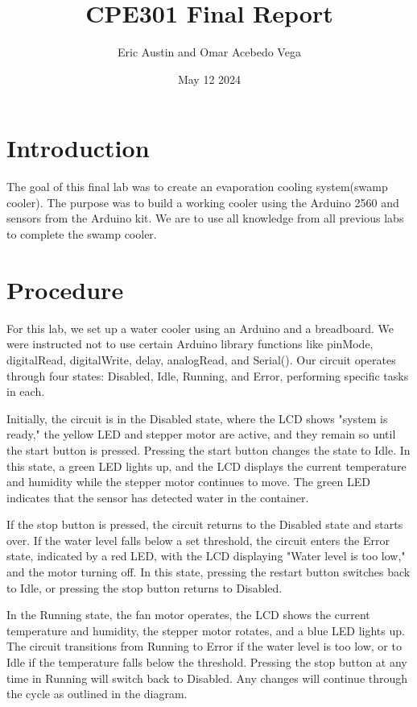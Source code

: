 \documentclass{article}
\title{CPE301 Final Report}
\author{Eric Austin and Omar Acebedo Vega}
\date{May 12 2024}
\begin{document}
\maketitle

\section{Introduction}
The goal of this final lab was to create an evaporation cooling system(swamp cooler). The purpose was to build a working cooler using the Arduino
2560 and sensors from the Arduino kit. We are to use all knowledge from all previous labs to complete the swamp cooler.
\section{Procedure}
For this lab, we set up a water cooler using an Arduino and a breadboard. We were instructed not to use certain Arduino library functions like pinMode, digitalRead, digitalWrite, delay, analogRead, and Serial(). Our circuit operates through four states: Disabled, Idle, Running, and Error, performing specific tasks in each.

Initially, the circuit is in the Disabled state, where the LCD shows "system is ready," the yellow LED and stepper motor are active, and they remain so until the start button is pressed. Pressing the start button changes the state to Idle. In this state, a green LED lights up, and the LCD displays the current temperature and humidity while the stepper motor continues to move. The green LED indicates that the sensor has detected water in the container.

If the stop button is pressed, the circuit returns to the Disabled state and starts over. If the water level falls below a set threshold, the circuit enters the Error state, indicated by a red LED, with the LCD displaying "Water level is too low," and the motor turning off. In this state, pressing the restart button switches back to Idle, or pressing the stop button returns to Disabled.

In the Running state, the fan motor operates, the LCD shows the current temperature and humidity, the stepper motor rotates, and a blue LED lights up. The circuit transitions from Running to Error if the water level is too low, or to Idle if the temperature falls below the threshold. Pressing the stop button at any time in Running will switch back to Disabled. Any changes will continue through the cycle as outlined in the diagram.
\end{document}
